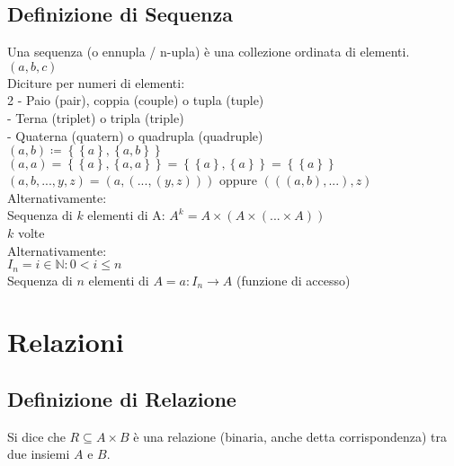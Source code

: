 \documentclass[a4paper, twoside, italian, 11pt]{book}
\newcommand{\braces}[1] {\left \{ #1 \right \}}
\newcommand{\N}{\mathbb N}
\begin{document}
\section{Definizione di Sequenza}

Una sequenza (o ennupla / n-upla) è una collezione ordinata di elementi. \\

$(a, b, c)$ \\

\noindent
Diciture per numeri di elementi: \\

2 - Paio (pair), coppia (couple) o tupla (tuple) \\
 - Terna (triplet) o tripla (triple) \\
 - Quaterna (quatern) o quadrupla (quadruple) \\

\noindent
$(a, b) \coloneqq \braces{\braces{a}, \braces{a, b}}$ \\
$(a, a) = \braces{\braces{a}, \braces{a, a}} = \braces{\braces{a}, \braces{a}} = \braces{\braces{a}}$ \\
$(a, b, ..., y, z) = (a, (..., (y, z)))$ oppure $(((a, b), ...), z)$ \\

\noindent
Alternativamente: \\
\indent
Sequenza di $k$ elementi di A: $A^k = A \times (A \times (... \times A))$ \\
\indent
$k$ volte \\

\noindent
Alternativamente: \\
\indent
$I_n = {i \in \N : 0 < i \leq n}$ \\
\indent
Sequenza di $n$ elementi di $A = a : I_n \rightarrow A$ (funzione di accesso)



\chapter{Relazioni}



\section{Definizione di Relazione}

Si dice che $R \subseteq A \times B$ è una relazione (binaria, anche detta corrispondenza) tra due insiemi $A$ e $B$.\\
\end{document}
